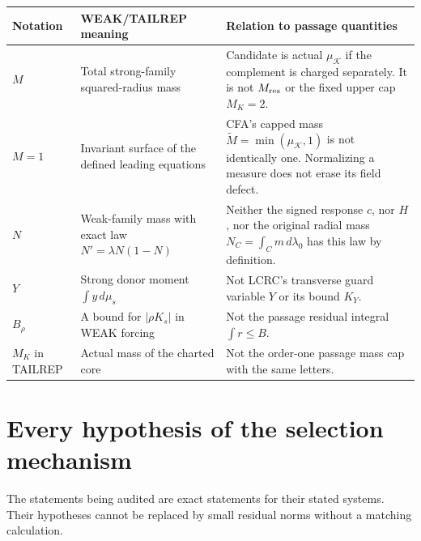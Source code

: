 \documentclass[11pt]{article}
\numberwithin{equation}{section}
\theoremstyle{remark}\newtheorem{remark}[proposition]{Remark}
\newcommand{\dd}{\,d}\newcommand{\E}{\mathbb E}
\newcommand{\KK}{\mathcal K}\newcommand{\BB}{\mathcal B}
\begin{document}
\begin{center}
\begin{tabular}{p{}p{}p{}}
\toprule
Notation & WEAK/TAILREP meaning & Relation to passage quantities\\\midrule
$M$ & Total strong-family squared-radius mass & Candidate is actual
$\mu_{\KK}$ if the complement is charged separately. It is not
$M_{\rm res}$ or the fixed upper cap $M_K=2$.\\[3pt]
$M=1$ & Invariant surface of the defined leading equations &
CFA's capped mass $\widetilde M=\min(\mu_{\KK},1)$ is not identically
one. Normalizing a measure does not erase its field defect.\\[3pt]
$N$ & Weak-family mass with exact law $N'=\lambda N(1-N)$ &
Neither the signed response $c$, nor $H$, nor the original radial mass
$N_C=\int_Cm\dd\lambda_0$ has this law by definition.\\[3pt]
$Y$ & Strong donor moment $\int y\dd\mu_s$ & Not LCRC's transverse
guard variable $Y$ or its bound $K_Y$.\\[3pt]
$B_\rho$ & A bound for $|\rho K_s|$ in WEAK forcing & Not the
passage residual integral $\int r\le B$.\\[3pt]
$M_K$ in TAILREP & Actual mass of the charted core & Not the
order-one passage mass cap with the same letters.\\
\bottomrule
\end{tabular}
\end{center}

\section{Every hypothesis of the selection mechanism}
\label{an03siv1:inventory}
The statements being audited are exact statements for their stated
systems. Their hypotheses cannot be replaced by small residual norms
without a matching calculation.
\end{document}
